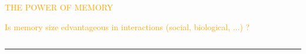 \documentclass[usenames,dvipsnames,t]{beamer}
\begin{document}
\begin{columns}
    \begin{column}{.7\linewidth}
    \vspace{1.5cm}

    \centering
    \textcolor{orange}{\fontsize{110}{120} \selectfont THE POWER OF MEMORY}
    \vspace{0.7cm}

    \Large\textcolor{orange}{Is memory size edvantageous in interactions (social,
    biological, $\dots$) ?}
    \end{column}
    \begin{column}{.2\linewidth}
        
        \begin{center}
            
        \end{center}
        \end{column}

    \begin{column}{.02\linewidth}
    \end{column}
\end{columns}
\vspace{1cm}

\hrule height 3pt
\vspace{1cm}
\end{document}
